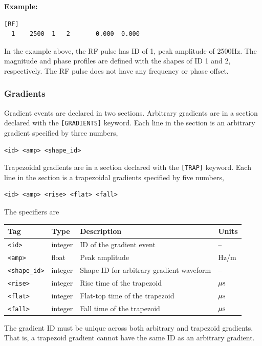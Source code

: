 \documentclass{article}
\begin{document}
\begin{minipage}{\textwidth}
\textbf{Example:}
\begin{lstlisting}
[RF]
  1    2500  1   2       0.000  0.000
\end{lstlisting}
\end{minipage}

In the example above, the RF pulse has ID of 1, peak amplitude of 2500Hz. The magnitude and phase profiles are defined with the shapes of ID 1 and 2, respectively. The RF pulse does not have any frequency or phase offset.

\subsubsection{Gradients}
Gradient events are declared in two sections. Arbitrary gradients are in a section declared with the \verb.[GRADIENTS]. keyword. Each line in the section is an arbitrary gradient specified by three numbers,
\begin{lstlisting}
<id> <amp> <shape_id>
\end{lstlisting}
Trapezoidal gradients are in a section declared with the \verb.[TRAP]. keyword. Each line in the section is a trapezoidal gradients specified by five numbers,
\begin{lstlisting}
<id> <amp> <rise> <flat> <fall>
\end{lstlisting}

The specifiers are

\begin{tabularx}{\textwidth}{llXl}
\toprule
Tag & Type & Description & Units\\
\midrule
\verb.<id>. & integer & ID of the gradient event & -- \\
\verb.<amp>. & float & Peak amplitude & Hz/m \\
\verb.<shape_id>. & integer & Shape ID for arbitrary gradient waveform & -- \\
\verb.<rise>. & integer & Rise time of the trapezoid & $\rm \mu s$ \\
\verb.<flat>. & integer & Flat-top time of the trapezoid & $\rm \mu s$ \\
\verb.<fall>. & integer & Fall time of the trapezoid & $\rm \mu s$ \\
\bottomrule
\end{tabularx}

The gradient ID must be unique across both arbitrary and trapezoid gradients. That is, a trapezoid gradient cannot have the same ID as an arbitrary gradient.
\end{document}
